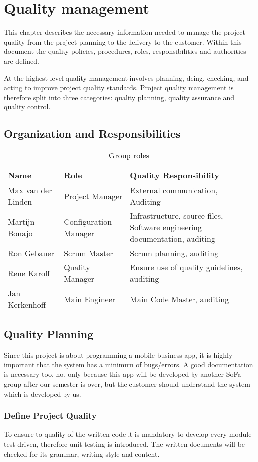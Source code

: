 \section{Quality management}
This chapter describes the necessary information needed to manage the project quality from the project planning to the delivery
to the customer. Within this document the quality policies, procedures, roles, responsibilities and authorities are defined.

At the highest level quality management involves planning, doing, checking, and acting to improve project quality standards. Project quality management is therefore split into three categories: quality planning, quality assurance and quality control.
\subsection{Organization and Responsibilities}
\begin{table}[htbp]
	\begin{tabular}{ p{4cm} p{} p{} }
		\textbf{Name} & \textbf{Role} & \textbf{Quality Responsibility} \\ \hline
		Max van der Linden & Project Manager & External communication, Auditing \\
		Martijn Bonajo & Configuration Manager & Infrastructure, source files, Software engineering documentation, auditing \\
		Ron Gebauer & Scrum Master & Scrum planning, auditing \\
		Rene Karoff & Quality Manager & Ensure use of quality guidelines, auditing \\
		Jan Kerkenhoff & Main Engineer & Main Code Master, auditing \\
	\end{tabular}
	\caption{Group roles\label{tab:GroupRoles}}
\end{table}

\subsection{Quality Planning}
Since this project is about programming a mobile business \gls{app}, it is highly important that the system has a minimum of bugs/errors. A good documentation is necessary too, not only because this \gls{app} will be developed by another SoFa group after our semester is over, but the customer should understand the system which is developed by us.
\subsubsection{Define Project Quality}
To ensure to quality of the written code it is mandatory to develop every module test-driven, therefore unit-testing is introduced. The written documents will be checked for its grammar, writing style and content.
